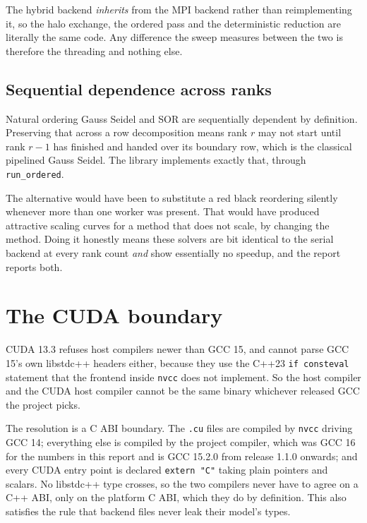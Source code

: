 The hybrid backend \emph{inherits} from the MPI backend rather than
reimplementing it, so the halo exchange, the ordered pass and the deterministic
reduction are literally the same code. Any difference the sweep measures between
the two is therefore the threading and nothing else.

\subsection{Sequential dependence across ranks}

Natural ordering Gauss Seidel and SOR are sequentially dependent by definition.
Preserving that across a row decomposition means rank $r$ may not start until
rank $r-1$ has finished and handed over its boundary row, which is the classical
pipelined Gauss Seidel. The library implements exactly that, through
\texttt{run\_ordered}.

The alternative would have been to substitute a red black reordering silently
whenever more than one worker was present. That would have produced attractive
scaling curves for a method that does not scale, by changing the method. Doing
it honestly means these solvers are bit identical to the serial backend at every
rank count \emph{and} show essentially no speedup, and the report reports both.

\section{The CUDA boundary}
\label{sec:cuda-design}

CUDA 13.3 refuses host compilers newer than GCC 15, and cannot parse GCC 15's
own libstdc++ headers either, because they use the C++23 \texttt{if consteval}
statement that the frontend inside \texttt{nvcc} does not implement. So the host
compiler and the CUDA host compiler cannot be the same binary whichever released
GCC the project picks.

The resolution is a C ABI boundary. The \texttt{.cu} files are compiled by
\texttt{nvcc} driving GCC 14; everything else is compiled by the project
compiler, which was GCC 16 for the numbers in this report and is GCC 15.2.0 from
release 1.1.0 onwards; and every CUDA entry point is declared \texttt{extern
"C"} taking plain pointers and scalars. No libstdc++ type crosses, so the two
compilers never have to agree on a C++ ABI, only on the platform C ABI, which
they do by definition. This also satisfies the rule that backend files never
leak their model's types.

